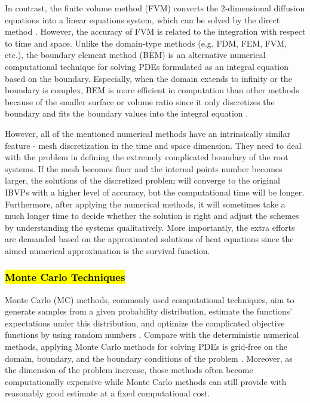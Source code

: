 In contrast, the finite volume method (FVM) converts the
$2$-dimensional diffusion equations into a linear equations system,
which can be solved by the direct method
\cite{eymard2000finite}. However, the accuracy of FVM is related to
the integration with respect to time and space. Unlike the domain-type
methods (e.g. FDM, FEM, FVM, etc.), the boundary element method (BEM)
is an alternative numerical computational technique for solving PDEs
formulated as an integral equation based on the boundary. Especially,
when the domain extends to infinity or the boundary is complex, BEM is
more efficient in computation than other methods because of the
smaller surface or volume ratio \cite{katsikadelis2002boundary} since
it only discretizes the boundary and fits the boundary values into the
integral equation \cite{ang2007beginner}.


However, all of the mentioned numerical methods have an intrinsically
similar feature - mesh discretization in the time and space
dimension. They need to deal with the problem in defining the
extremely complicated boundary of the root systems. If the mesh
becomes finer and the internal points number becomes larger, the
solutions of the discretized problem will converge to the original
IBVPs with a higher level of accuracy, but the computational time will
be longer. Furthermore, after applying the numerical methods, it will
sometimes take a much longer time to decide whether the solution is
right and adjust the schemes by understanding the systems
qualitatively. More importantly, the extra efforts are demanded based
on the approximated solutions of heat equations since the aimed
numerical approximation is the survival function.




\subsubsection{\textcolor{red}{\textbf{\hl{Monte Carlo Techniques}}}}


Monte Carlo (MC) methods, commonly used computational techniques, aim
to generate samples from a given probability distribution, estimate
the functions' expectations under this distribution, and optimize the
complicated objective functions by using random numbers
\cite{kroese2014monte}. Compare with the deterministic numerical
methods, applying Monte Carlo methods for solving PDEs is grid-free on
the domain, boundary, and the boundary conditions of the problem
\cite{grebenkov2014efficient}. Moreover, as the dimension of the
problem increase, those methods often become computationally expensive
while Monte Carlo methods can still provide with reasonably good
estimate at a fixed computational cost. 

